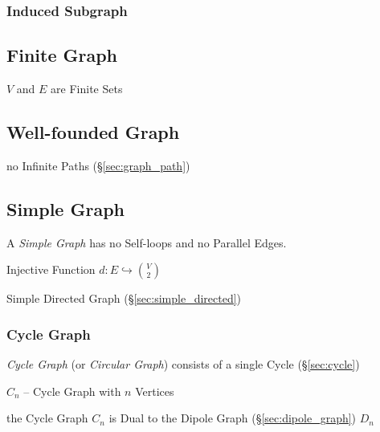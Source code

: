 \subsubsection{Induced Subgraph}\label{sec:induced_subgraph}



\subsection{Finite Graph}\label{sec:finite_graph}

$V$ and $E$ are Finite Sets



\subsection{Well-founded Graph}\label{sec:wellfounded_graph}

no Infinite Paths (\S\ref{sec:graph_path})



\subsection{Simple Graph}\label{sec:simple_graph}

A \emph{Simple Graph} has no Self-loops and no Parallel Edges.

Injective Function $d : E \hookrightarrow {V \choose 2}$

Simple Directed Graph (\S\ref{sec:simple_directed})



\subsubsection{Cycle Graph}\label{sec:cycle_graph}

\emph{Cycle Graph} (or \emph{Circular Graph}) consists of a single Cycle
(\S\ref{sec:cycle})

$C_n$ -- Cycle Graph with $n$ Vertices

the Cycle Graph $C_n$ is Dual to the Dipole Graph (\S\ref{sec:dipole_graph})
$D_n$

